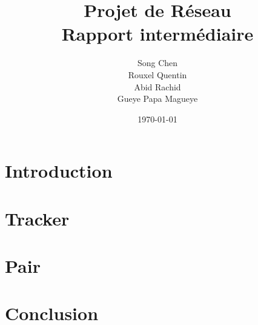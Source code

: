 \documentclass[a4]{report}
\begin{document}
\title{\huge{\textbf{Projet de Réseau}}\\ \Large{\textbf{Rapport intermédiaire}}\\}
\author{Song Chen\\ Rouxel Quentin \\ Abid Rachid \\ Gueye Papa Magueye}
\date{\today}

\maketitle{}

\newpage

\chapter*{Introduction}


\chapter{Tracker}


\chapter{Pair}


\chapter*{Conclusion}

\end{document}
